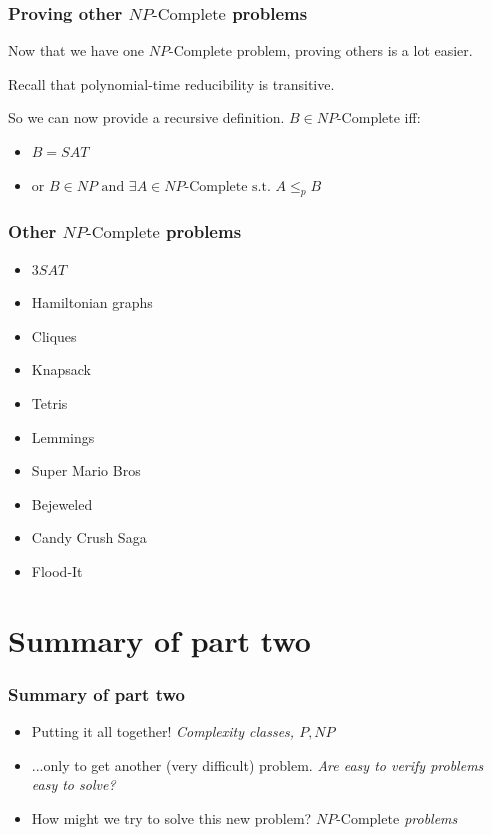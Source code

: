 \documentclass[aspectratio=169]{beamer}
\begin{document}
\begin{frame}
\frametitle{Proving other $NP\text{-Complete}$ problems}

Now that we have one $NP\text{-Complete}$ problem, proving others is a lot easier.

Recall that polynomial-time reducibility is transitive.

So we can now provide a recursive definition. $B \in NP\text{-Complete}$ iff:

\begin{itemize}
    \item $B = SAT$
    \item or $B \in NP \text{ and } \exists A \in NP\text{-Complete s.t. } A \leq_p B$
\end{itemize}
\end{frame}

\begin{frame}
\frametitle{Other $NP\text{-Complete}$ problems}
\begin{itemize}
    \item<1-> $3SAT$
    \item<2-> Hamiltonian graphs
    \item<3-> Cliques
    \item<4-> Knapsack
    \item<5-> Tetris
    \item<6-> Lemmings
    \item<7-> Super Mario Bros
    \item<8-> Bejeweled
    \item<9-> Candy Crush Saga
    \item<10-> Flood-It
\end{itemize}
\end{frame}

\section{Summary of part two}

\begin{frame}
\frametitle{Summary of part two}
\begin{itemize}
    \item Putting it all together! {\em Complexity classes, $P, NP$}
    \item ...only to get another (very difficult) problem. {\em Are easy to verify problems easy to solve?}
    \item How might we try to solve this new problem? {\em $NP\text{-Complete}$ problems}
\end{itemize}
\end{frame}
\end{document}
